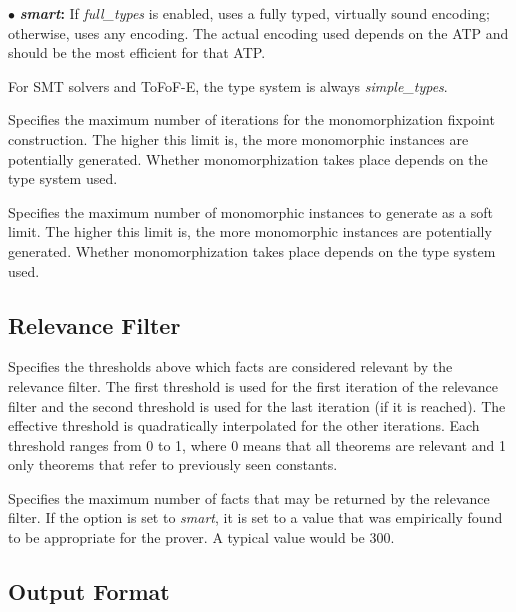 \documentclass[a4paper,12pt]{article}
\begin{document}
\begin{enum}
\begin{enum}
\item[$\bullet$] \textbf{\textit{smart}:} If \textit{full\_types} is enabled,
uses a fully typed, virtually sound encoding; otherwise, uses any encoding. The
actual encoding used depends on the ATP and should be the most efficient for
that ATP.
\end{enum}

For SMT solvers and ToFoF-E, the type system is always \textit{simple\_types}.

Specifies the maximum number of iterations for the monomorphization fixpoint
construction. The higher this limit is, the more monomorphic instances are
potentially generated. Whether monomorphization takes place depends on the
type system used.

Specifies the maximum number of monomorphic instances to generate as a soft
limit. The higher this limit is, the more monomorphic instances are potentially
generated. Whether monomorphization takes place depends on the type system used.
\end{enum}

\subsection{Relevance Filter}
\label{relevance-filter}

\begin{enum}
Specifies the thresholds above which facts are considered relevant by the
relevance filter. The first threshold is used for the first iteration of the
relevance filter and the second threshold is used for the last iteration (if it
is reached). The effective threshold is quadratically interpolated for the other
iterations. Each threshold ranges from 0 to 1, where 0 means that all theorems
are relevant and 1 only theorems that refer to previously seen constants.

Specifies the maximum number of facts that may be returned by the relevance
filter. If the option is set to \textit{smart}, it is set to a value that was
empirically found to be appropriate for the prover. A typical value would be
300.

\end{enum}

\subsection{Output Format}
\label{output-format}
\end{document}

